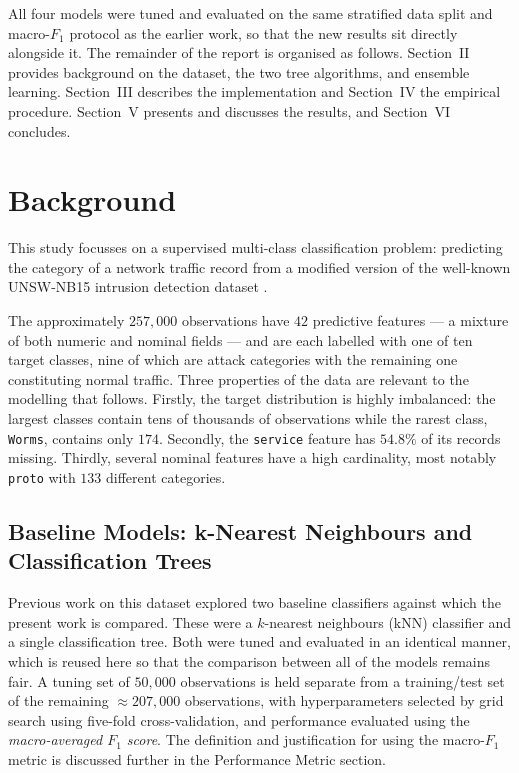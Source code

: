 \documentclass[conference]{IEEEtran}
\begin{document}
All four models were tuned and evaluated on the same stratified data split and macro-$F_1$ protocol
as the earlier work, so that the new results sit directly alongside it. The remainder of the report
is organised as follows. Section~II provides background on the dataset, the two tree algorithms, and
ensemble learning. Section~III describes the implementation and Section~IV the empirical procedure.
Section~V presents and discusses the results, and Section~VI concludes.

\section{Background} %

This study focusses on a supervised multi-class classification problem: predicting the
category of a network traffic record from a modified version of the well-known UNSW-NB15 
intrusion detection dataset \cite{moustafa2015unsw}. 

The approximately $257{,}000$
observations have $42$ predictive features --- a mixture of both numeric 
and nominal fields --- and are each labelled with one of ten target
classes, nine of which are attack categories with the remaining one constituting normal traffic.
Three properties of the data are relevant to the modelling that follows.
Firstly, the target distribution is highly imbalanced:
the largest classes contain tens of thousands of observations while the rarest class,
\texttt{Worms}, contains only $174$. Secondly, the
\texttt{service} feature has $54.8\%$ of its records missing. Thirdly, several nominal
features have a high cardinality, most notably \texttt{proto} with $133$ different
categories.

\subsection{Baseline Models: k-Nearest Neighbours and Classification Trees} %

Previous work on this dataset \cite{a2} explored two baseline classifiers against which
the present work is compared. These were a $k$-nearest neighbours (kNN) classifier and a single
classification tree.
Both were tuned and evaluated in an identical manner, which
is reused here so that the comparison between all of the models remains fair.
A tuning set of
$50{,}000$ observations is held separate from a training/test set of the remaining
$\approx\!207{,}000$ observations, with hyperparameters selected by grid search using
five-fold cross-validation, and performance evaluated using the
\emph{macro-averaged $F_1$ score}. The definition and justification for using
the macro-$F_1$ metric is discussed further in the Performance Metric section.
\end{document}
